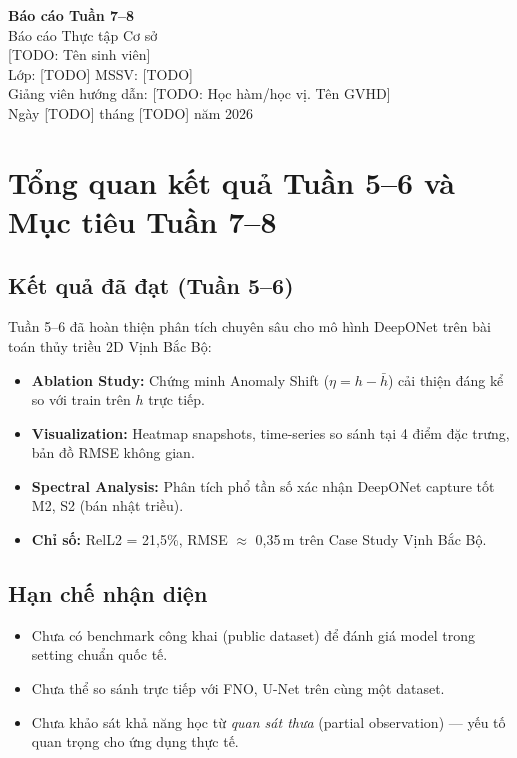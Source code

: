 \documentclass[12pt,a4paper]{article}
\begin{document}
\begin{center}
  {\LARGE\bfseries Báo cáo Tuần 7--8}\\[4pt]
  {\large Báo cáo Thực tập Cơ sở}\\[12pt]
  [TODO: Tên sinh viên]\\
  Lớp: [TODO] \quad MSSV: [TODO]\\
  Giảng viên hướng dẫn: [TODO: Học hàm/học vị. Tên GVHD]\\[4pt]
  Ngày [TODO] tháng [TODO] năm 2026
\end{center}

\vspace{1em}

\section{Tổng quan kết quả Tuần 5--6 và Mục tiêu Tuần 7--8}

\subsection{Kết quả đã đạt (Tuần 5--6)}

Tuần 5--6 đã hoàn thiện phân tích chuyên sâu cho mô hình DeepONet trên bài toán thủy triều 2D Vịnh Bắc Bộ:
\begin{itemize}[nosep]
  \item \textbf{Ablation Study:} Chứng minh Anomaly Shift ($\eta = h - \bar{h}$) cải thiện đáng kể so với train trên $h$ trực tiếp.
  \item \textbf{Visualization:} Heatmap snapshots, time-series so sánh tại 4 điểm đặc trưng, bản đồ RMSE không gian.
  \item \textbf{Spectral Analysis:} Phân tích phổ tần số xác nhận DeepONet capture tốt M2, S2 (bán nhật triều).
  \item \textbf{Chỉ số:} RelL2 = 21,5\%, RMSE $\approx$ 0,35\,m trên Case Study Vịnh Bắc Bộ.
\end{itemize}

\subsection{Hạn chế nhận diện}

\begin{itemize}[nosep]
  \item Chưa có benchmark công khai (public dataset) để đánh giá model trong setting chuẩn quốc tế.
  \item Chưa thể so sánh trực tiếp với FNO, U-Net trên cùng một dataset.
  \item Chưa khảo sát khả năng học từ \emph{quan sát thưa} (partial observation) --- yếu tố quan trọng cho ứng dụng thực tế.
\end{itemize}
\end{document}
